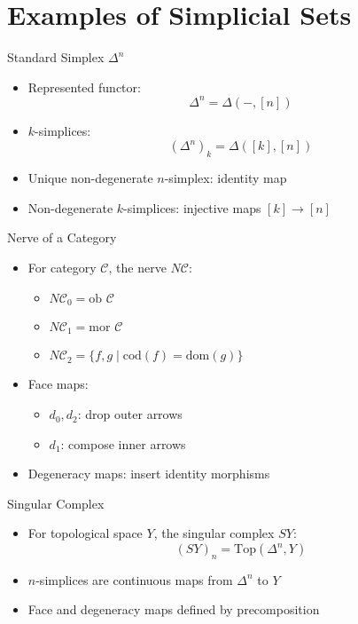 \documentclass{beamer}
\begin{document}
\section{Examples of Simplicial Sets}

\begin{frame}{Standard Simplex \(\Delta^n\)}
  \begin{itemize}
    \item Represented functor:
      \[
      \Delta^n = \Delta(-, [n])
      \]
    \item \(k\)-simplices:
      \[
      (\Delta^n)_k = \Delta([k], [n])
      \]
    \item Unique non-degenerate \(n\)-simplex: identity map
    \item Non-degenerate \(k\)-simplices: injective maps \([k] \to [n]\)
  \end{itemize}
\end{frame}

\begin{frame}{Nerve of a Category}
  \begin{itemize}
    \item For category \(\mathcal{C}\), the nerve \(N\mathcal{C}\):
      \begin{itemize}
        \item \(N\mathcal{C}_0 = \text{ob }\mathcal{C}\)
        \item \(N\mathcal{C}_1 = \text{mor }\mathcal{C}\)
        \item \(N\mathcal{C}_2 = \{f, g \mid \text{cod}(f) = \text{dom}(g)\}\)
      \end{itemize}
    \item Face maps:
      \begin{itemize}
        \item \(d_0, d_2\): drop outer arrows
        \item \(d_1\): compose inner arrows
      \end{itemize}
    \item Degeneracy maps: insert identity morphisms
  \end{itemize}
\end{frame}

\begin{frame}{Singular Complex}
  \begin{itemize}
    \item For topological space \(Y\), the singular complex \(SY\):
      \[
      (SY)_n = \text{Top}(\Delta^n, Y)
      \]
    \item \(n\)-simplices are continuous maps from \(\Delta^n\) to \(Y\)
    \item Face and degeneracy maps defined by precomposition
  \end{itemize}
\end{frame}
\end{document}

